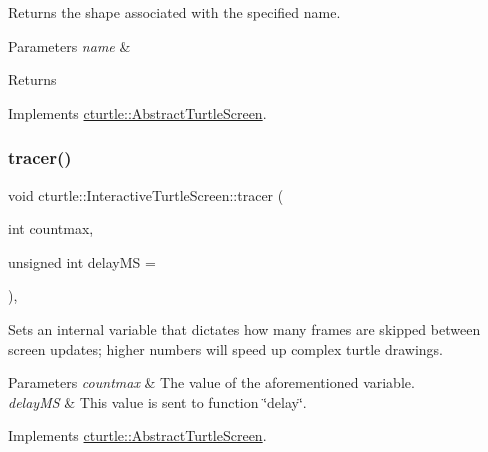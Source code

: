 Returns the shape associated with the specified name. 
\begin{DoxyParams}{Parameters}
{\em name} & \\
\hline
\end{DoxyParams}
\begin{DoxyReturn}{Returns}

\end{DoxyReturn}


Implements \hyperlink{classcturtle_1_1AbstractTurtleScreen}{cturtle\+::\+Abstract\+Turtle\+Screen}.

\mbox{\label{classcturtle_1_1InteractiveTurtleScreen_ac6cbbcf714c490abb300cd6a931950f3}} 
\subsubsection{\texorpdfstring{tracer()}{tracer()}}
{\footnotesize\ttfamily void cturtle\+::\+Interactive\+Turtle\+Screen\+::tracer (\begin{DoxyParamCaption}\item[{int}]{countmax,  }\item[{unsigned int}]{delay\+MS = {} }\end{DoxyParamCaption})\hspace{0.3cm}{\ttfamily [inline]}, {\ttfamily [virtual]}}

Sets an internal variable that dictates how many frames are skipped between screen updates; higher numbers will speed up complex turtle drawings. 
\begin{DoxyParams}{Parameters}
{\em countmax} & The value of the aforementioned variable. \\
\hline
{\em delay\+MS} & This value is sent to function \char`\"{}delay\char`\"{}. \\
\hline
\end{DoxyParams}


Implements \hyperlink{classcturtle_1_1AbstractTurtleScreen}{cturtle\+::\+Abstract\+Turtle\+Screen}.

\mbox{\label{classcturtle_1_1InteractiveTurtleScreen_adfefb43645347feb832072f8fc8da144}} 
